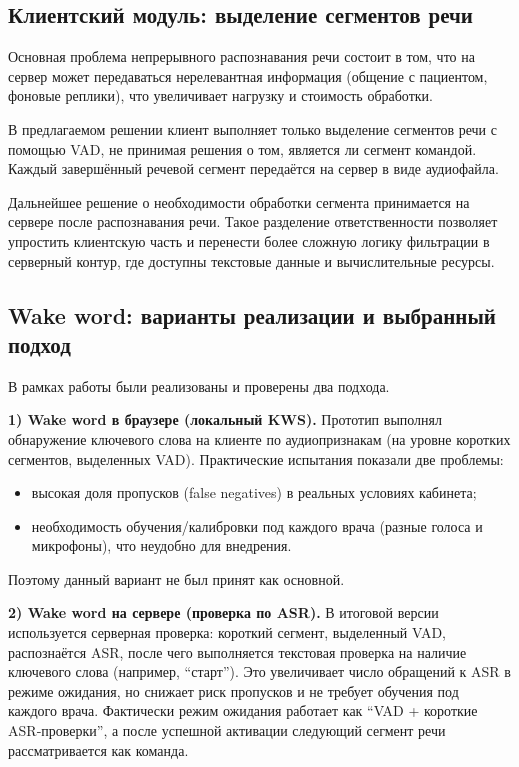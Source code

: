 \subsection{Клиентский модуль: выделение сегментов речи}
\label{subsec:task2}

Основная проблема непрерывного распознавания речи состоит в том, что на сервер может передаваться нерелевантная информация (общение с пациентом, фоновые реплики), что увеличивает нагрузку и стоимость обработки.

В предлагаемом решении клиент выполняет только выделение сегментов речи с помощью VAD, не принимая решения о том, является ли сегмент командой.
Каждый завершённый речевой сегмент передаётся на сервер в виде аудиофайла.

Дальнейшее решение о необходимости обработки сегмента принимается на сервере после распознавания речи.
Такое разделение ответственности позволяет упростить клиентскую часть и перенести более сложную логику фильтрации в серверный контур, где доступны текстовые данные и вычислительные ресурсы.

\subsection{Wake word: варианты реализации и выбранный подход}
\label{subsec:wakeword}

В рамках работы были реализованы и проверены два подхода.

\textbf{1) Wake word в браузере (локальный KWS).}
Прототип выполнял обнаружение ключевого слова на клиенте по аудиопризнакам (на уровне коротких сегментов, выделенных VAD).
Практические испытания показали две проблемы:
\begin{itemize}
    \item высокая доля пропусков (false negatives) в реальных условиях кабинета;
    \item необходимость обучения/калибровки под каждого врача (разные голоса и микрофоны), что неудобно для внедрения.
\end{itemize}
Поэтому данный вариант не был принят как основной.

\textbf{2) Wake word на сервере (проверка по ASR).}
В итоговой версии используется серверная проверка: короткий сегмент, выделенный VAD, распознаётся ASR, после чего выполняется текстовая проверка на наличие ключевого слова (например, \enquote{старт}).
Это увеличивает число обращений к ASR в режиме ожидания, но снижает риск пропусков и не требует обучения под каждого врача.
Фактически режим ожидания работает как \enquote{VAD + короткие ASR‑проверки}, а после успешной активации следующий сегмент речи рассматривается как команда.

